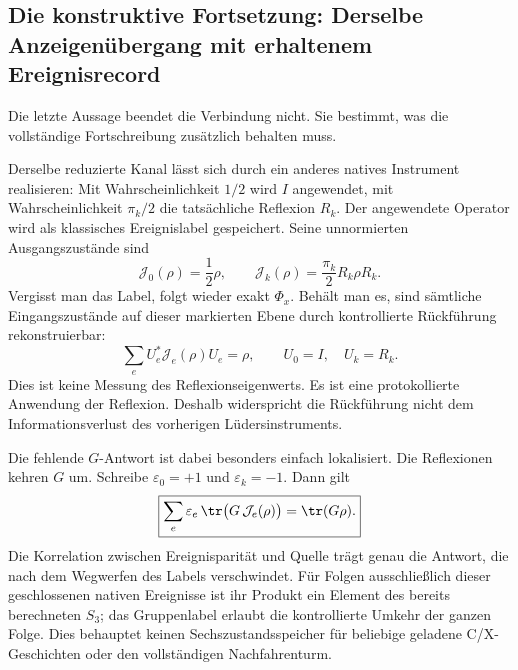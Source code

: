 \subsection{Die konstruktive Fortsetzung: Derselbe Anzeigenübergang mit erhaltenem Ereignisrecord}\label{sec:replicacarry}
Die letzte Aussage beendet die Verbindung nicht. Sie bestimmt, was die vollständige Fortschreibung zusätzlich behalten muss.

Derselbe reduzierte Kanal lässt sich durch ein anderes natives Instrument realisieren: Mit Wahrscheinlichkeit $1/2$ wird $I$ angewendet, mit Wahrscheinlichkeit $\pi_k/2$ die tatsächliche Reflexion $R_k$. Der angewendete Operator wird als klassisches Ereignislabel gespeichert. Seine unnormierten Ausgangszustände sind
\begin{equation}
\mathcal J_0(\rho)=\frac12\rho,\qquad
\mathcal J_k(\rho)=\frac{\pi_k}{2}R_k\rho R_k.
\end{equation}
Vergisst man das Label, folgt wieder exakt $\Phi_x$. Behält man es, sind sämtliche Eingangszustände auf dieser markierten Ebene durch kontrollierte Rückführung rekonstruierbar:
\begin{equation}\label{eq:recordrecovery}
\boxed{\sum_e U_e^*\mathcal J_e(\rho)U_e=\rho,\qquad
U_0=I,\quad U_k=R_k.}
\end{equation}
Dies ist keine Messung des Reflexionseigenwerts. Es ist eine protokollierte Anwendung der Reflexion. Deshalb widerspricht die Rückführung nicht dem Informationsverlust des vorherigen Lüdersinstruments.

Die fehlende $G$-Antwort ist dabei besonders einfach lokalisiert. Die Reflexionen kehren $G$ um. Schreibe $\varepsilon_0=+1$ und $\varepsilon_k=-1$. Dann gilt
\begin{equation}
\boxed{\sum_e\varepsilon_e\,\tr\bigl(G\,\mathcal J_e(\rho)\bigr)
=\tr(G\rho).}
\end{equation}
Die Korrelation zwischen Ereignisparität und Quelle trägt genau die Antwort, die nach dem Wegwerfen des Labels verschwindet. Für Folgen ausschließlich dieser geschlossenen nativen Ereignisse ist ihr Produkt ein Element des bereits berechneten $S_3$; das Gruppenlabel erlaubt die kontrollierte Umkehr der ganzen Folge. Dies behauptet keinen Sechszustandsspeicher für beliebige geladene C/X-Geschichten oder den vollständigen Nachfahrenturm.

